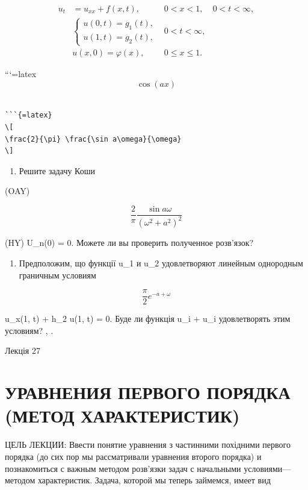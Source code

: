 \documentclass[
]{article}
\providecommand{\tightlist}{%
  \setlength{\itemsep}{0pt}\setlength{\parskip}{0pt}}
\begin{document}
\[
\begin{aligned} u_t &= u_{xx} + f(x, t), & 0 < x < 1, & 0 < t < \infty, \\ & \begin{cases} u(0, t) = g_1(t), \\ u(1, t) = g_2(t), \end{cases} & 0 < t < \infty, \\ & u(x, 0) = \varphi(x), & 0 \le x \le 1. \end{aligned}
\]

```{=latex}
\[
\cos(ax)
\]

\begin{verbatim}

```{=latex}
\[
\frac{2}{\pi} \frac{\sin a\omega}{\omega}
\]
\end{verbatim}

\begin{enumerate}
\def\labelenumi{\arabic{enumi}.}
\setcounter{enumi}{4}
\tightlist
\item
  Решите задачу Коши
\end{enumerate}

(OAY)

\[
\frac{2}{\pi} \frac{\sin a\omega}{(\omega^2+a^2)^2}
\]

(HY) U\_n(0) = 0. Можете ли вы проверить полученное розв'язок?

\begin{enumerate}
\def\labelenumi{\arabic{enumi}.}
\setcounter{enumi}{5}
\tightlist
\item
  Предположим, що функції u\_1 и u\_2 удовлетворяют линейным однородным
  граничным условиям
\end{enumerate}

\[
\frac{\pi}{2} e^{-a+\omega}
\]

u\_x(1, t) + h\_2 u(1, t) = 0. Буде ли функція u\_i + u\_i удовлетворять
этим условиям? , .

Лекція 27

\section{УРАВНЕНИЯ ПЕРВОГО ПОРЯДКА (МЕТОД
ХАРАКТЕРИСТИК)}\label{ux443ux440ux430ux432ux43dux435ux43dux438ux44f-ux43fux435ux440ux432ux43eux433ux43e-ux43fux43eux440ux44fux434ux43aux430-ux43cux435ux442ux43eux434-ux445ux430ux440ux430ux43aux442ux435ux440ux438ux441ux442ux438ux43a}

ЦЕЛЬ ЛЕКЦИИ: Ввести понятие уравнения з частинними похідними первого
порядка (до сих пор мы рассматривали уравнения второго порядка) и
познакомиться с важным методом розв'язки задач с начальными
условиями---методом характеристик. Задача, которой мы теперь займемся,
имеет вид
\end{document}
